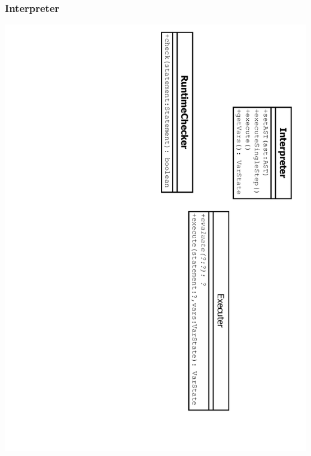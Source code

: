 \documentclass[10pt,a4paper,titlepage]{article}
\begin{document}
\subsubsection{Interpreter}
\includegraphics[angle=90, scale=0.6]{images/ClassInterpreter.pdf}
\end{document}
